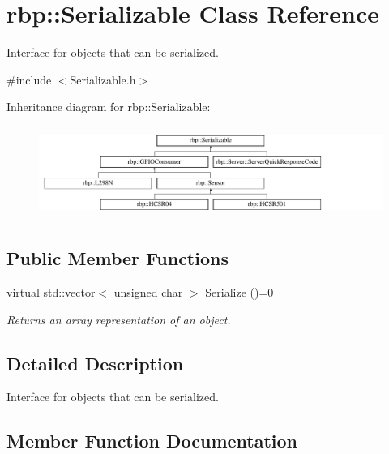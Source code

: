 \hypertarget{classrbp_1_1Serializable}{}\section{rbp\+:\+:Serializable Class Reference}
\label{classrbp_1_1Serializable}


Interface for objects that can be serialized.  




{\ttfamily \#include $<$Serializable.\+h$>$}

Inheritance diagram for rbp\+:\+:Serializable\+:\begin{figure}[H]
\begin{center}
\leavevmode
\includegraphics[height=3.022942cm]{classrbp_1_1Serializable}
\end{center}
\end{figure}
\subsection*{Public Member Functions}
\begin{DoxyCompactItemize}
\item 
virtual std\+::vector$<$ unsigned char $>$ \hyperlink{classrbp_1_1Serializable_a349896f5c3356330f914621033fda0bb}{Serialize} ()=0
\begin{DoxyCompactList}\small\item\em Returns an array representation of an object. \end{DoxyCompactList}\end{DoxyCompactItemize}


\subsection{Detailed Description}
Interface for objects that can be serialized. 



\subsection{Member Function Documentation}
\hypertarget{classrbp_1_1Serializable_a349896f5c3356330f914621033fda0bb}{}
